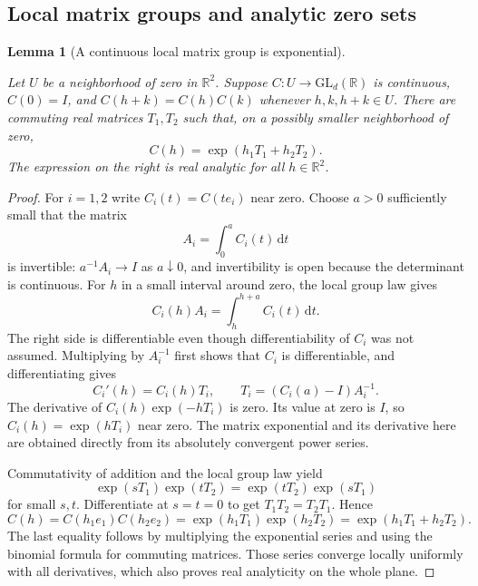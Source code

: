 \documentclass[11pt]{amsart}
\newcommand{\R}{\mathbb R}
\newcommand{\dd}{\,\mathrm d}
\newtheorem{lemma}[theorem]{Lemma}
\theoremstyle{definition}
\theoremstyle{remark}
\numberwithin{equation}{section}
\providecommand{\lean}[1]{}
\providecommand{\leanok}{}
\begin{document}
\subsection{Local matrix groups and analytic zero sets}

\begin{lemma}[A continuous local matrix group is exponential]
\label{ext:matrix-group}
\lean{Auto.ext_matrix_group,Auto.ext_matrix_group_analytic}
\leanok
Let $U$ be a neighborhood of zero in $\R^2$.  Suppose
$C:U\to\mathrm{GL}_d(\R)$ is continuous, $C(0)=I$, and
$C(h+k)=C(h)C(k)$ whenever $h,k,h+k\in U$.
There are commuting real matrices $T_1,T_2$ such that,
on a possibly smaller neighborhood of zero,
\[
 C(h)=\exp(h_1T_1+h_2T_2).
\]
The expression on the right is real analytic for all
$h\in\R^2$.
\end{lemma}
\begin{proof}
For $i=1,2$ write $C_i(t)=C(te_i)$ near zero.
Choose $a>0$ sufficiently small that the matrix
\[
 A_i=\int_0^a C_i(t)\dd t
\]
is invertible: $a^{-1}A_i\to I$ as $a\downarrow0$, and
invertibility is open because the determinant is continuous.
For $h$ in a small interval around zero, the local group law
gives
\[
 C_i(h)A_i=\int_h^{h+a}C_i(t)\dd t.
\]
The right side is differentiable even though differentiability
of $C_i$ was not assumed.  Multiplying by $A_i^{-1}$ first
shows that $C_i$ is differentiable, and differentiating gives
\[
 C_i'(h)=C_i(h)T_i,
 \qquad T_i=(C_i(a)-I)A_i^{-1}.
\]
The derivative of $C_i(h)\exp(-hT_i)$ is zero.  Its value at
zero is $I$, so $C_i(h)=\exp(hT_i)$ near zero.  The matrix
exponential and its derivative here are obtained directly
from its absolutely convergent power series.

Commutativity of addition and the local group law yield
\[
 \exp(sT_1)\exp(tT_2)=\exp(tT_2)\exp(sT_1)
\]
for small $s,t$.  Differentiate at $s=t=0$ to get
$T_1T_2=T_2T_1$.  Hence
\[
 C(h)=C(h_1e_1)C(h_2e_2)
     =\exp(h_1T_1)\exp(h_2T_2)
     =\exp(h_1T_1+h_2T_2).
\]
The last equality follows by multiplying the exponential
series and using the binomial formula for commuting matrices.
Those series converge locally uniformly with all derivatives,
which also proves real analyticity on the whole plane.
\end{proof}
\end{document}
